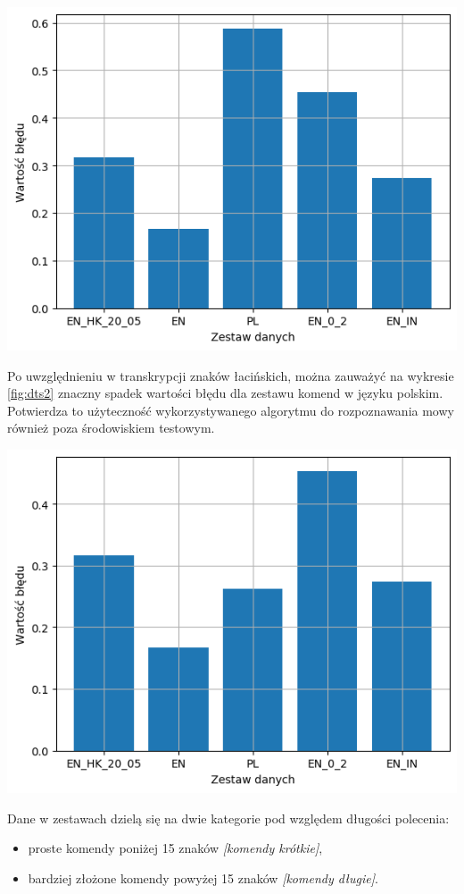 \begin{center}
    \includegraphics[width=0.7\linewidth]{files/output1.png}
    \label{fig:dts1}
\end{center}

Po uwzględnieniu w transkrypcji znaków łacińskich, można zauważyć na wykresie \ref{fig:dts2} znaczny spadek wartości błędu dla zestawu komend w języku polskim. Potwierdza to użyteczność wykorzystywanego algorytmu do rozpoznawania mowy również poza środowiskiem testowym.

\begin{center}
    \includegraphics[width=0.7\linewidth]{files/output2.png}
    \label{fig:dts2}
\end{center}

\break

Dane w zestawach dzielą się na dwie kategorie pod względem długości polecenia:
\begin{itemize}
    \item proste komendy poniżej 15 znaków \textit{[komendy krótkie]},
    \item bardziej złożone komendy powyżej 15 znaków \textit{[komendy długie]}.
\end{itemize}

